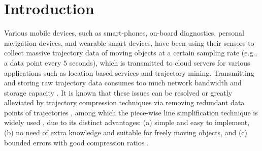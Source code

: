 \section{Introduction}
\label{sec-intro}

Various mobile devices, such as smart-phones, on-board diagnostics, personal navigation devices, and wearable smart devices, have been using their sensors to collect massive trajectory data of moving objects at a certain sampling rate (e.g., a data point every $5$ seconds), which is transmitted to cloud servers for various applications such as location based services and trajectory mining.
%
Transmitting and storing raw trajectory data consumes too much network bandwidth and storage capacity \cite{Chen:Trajectory, Meratnia:Spatiotemporal, Liu:BQS, Muckell:Compression,Cao:Spatio, Popa:Spatio,Nibali:Trajic}. %
%
%
It is known that these issues can be resolved or greatly alleviated by trajectory compression techniques via removing redundant data points of trajectories \cite{Douglas:Peucker, Hershberger:Speeding, Meratnia:Spatiotemporal, Liu:BQS, Muckell:survey, Muckell:Compression, Chen:Trajectory, Cao:Spatio, Shi:Survey, Nibali:Trajic, Long:Direction, Popa:Spatio, Han:Compress, Chen:Fast}, among which the piece-wise line simplification technique is widely used \cite{Douglas:Peucker, Meratnia:Spatiotemporal, Muckell:survey, Muckell:Compression, Chen:Trajectory, Cao:Spatio, Shi:Survey, Liu:BQS, Lin:Operb, Chen:Fast}, due to its distinct advantages: (a) simple and easy to implement, (b) no need of extra knowledge and suitable for freely  moving  objects, and (c) bounded errors with good compression ratios \cite{Popa:Spatio,Lin:Operb}.

